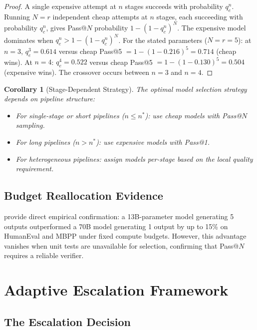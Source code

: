 \documentclass[11pt, a4paper, logo, copyright]{googledeepmind}
\newtheorem{corollary}{Corollary}[section]
\begin{document}
\begin{proof}
A single expensive attempt at $n$ stages succeeds with probability $q_e^n$. Running $N = r$ independent cheap attempts at $n$ stages, each succeeding with probability $q_c^n$, gives Pass@$N$ probability $1 - (1 - q_c^n)^N$. The expensive model dominates when $q_e^n > 1 - (1 - q_c^n)^N$. For the stated parameters ($N = r = 5$): at $n = 3$, $q_e^3 = 0.614$ versus cheap Pass@5 $= 1 - (1 - 0.216)^5 = 0.714$ (cheap wins). At $n = 4$: $q_e^4 = 0.522$ versus cheap Pass@5 $= 1 - (1 - 0.130)^5 = 0.504$ (expensive wins). The crossover occurs between $n = 3$ and $n = 4$.
\end{proof}

\begin{corollary}[Stage-Dependent Strategy]
\label{cor:strategy}
The optimal model selection strategy depends on pipeline structure:
\begin{itemize}
\item For single-stage or short pipelines ($n \leq n^*$): use cheap models with Pass@$N$ sampling.
\item For long pipelines ($n > n^*$): use expensive models with Pass@1.
\item For heterogeneous pipelines: assign models per-stage based on the local quality requirement.
\end{itemize}
\end{corollary}

\subsection{Budget Reallocation Evidence}

\citet{hassid2024budget} provide direct empirical confirmation: a 13B-parameter model generating 5 outputs outperformed a 70B model generating 1 output by up to 15\% on HumanEval and MBPP under fixed compute budgets. However, this advantage vanishes when unit tests are unavailable for selection, confirming that Pass@$N$ requires a reliable verifier.


\section{Adaptive Escalation Framework}
\label{sec:escalation}

\subsection{The Escalation Decision}
\end{document}
